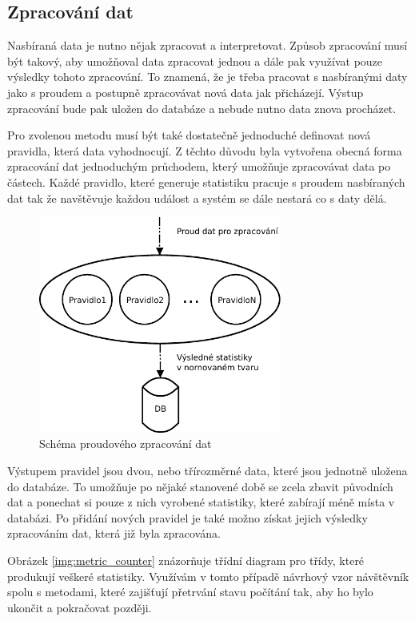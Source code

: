 \documentclass[bc,male,java,dept456]{diploma}						%
\begin{document}
\subsection{Zpracování dat}

Nasbíraná data je nutno nějak zpracovat a interpretovat. Způsob zpracování musí být takový, aby umožňoval data zpracovat jednou a dále pak využívat pouze výsledky tohoto zpracování. To znamená, že je třeba pracovat s nasbíranými daty jako s proudem a postupně zpracovávat nová data jak přicházejí. Výstup zpracování bude pak uložen do databáze a nebude nutno data znova procházet.

Pro zvolenou metodu musí být také dostatečně jednoduché definovat nová pravidla, která data vyhodnocují. Z těchto důvodu byla vytvořena obecná forma zpracování dat jednoduchým průchodem, který umožňuje zpracovávat data po částech. Každé pravidlo, které generuje statistiku pracuje s proudem nasbíraných dat tak že navštěvuje každou událost a systém se dále nestará co s daty dělá.

\begin{figure}[h]
	\centering
	\includegraphics[width=8cm]{img/zpracovani_2.pdf}
	\caption{Schéma proudového zpracování dat}
	\label{img:measuring}
\end{figure}

Výstupem pravidel jsou dvou, nebo třírozměrné data, které jsou jednotně uložena do databáze. To umožňuje po nějaké stanovené době se zcela zbavit původních dat a ponechat si pouze z nich vyrobené statistiky, které zabírají méně místa v databázi. Po přidání nových pravidel je také možno získat jejich výsledky zpracováním dat, která již byla zpracována.

Obrázek \ref{img:metric_counter} znázorňuje třídní diagram pro třídy, které produkují veškeré statistiky. Využívám v tomto případě návrhový vzor návštěvník\cite{visitor} spolu s metodami, které zajišťují přetrvání stavu počítání tak, aby ho bylo ukončit a pokračovat později.
\end{document}
